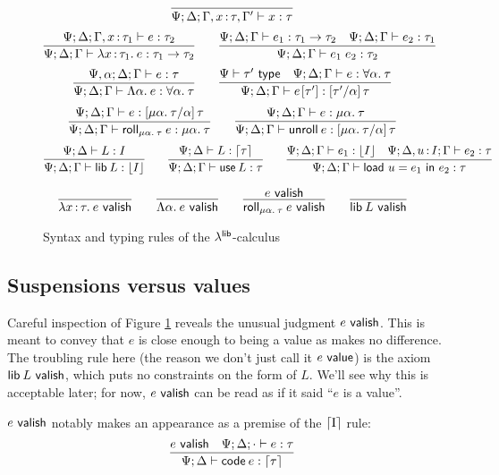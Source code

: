 \documentclass[11pt]{article}
\begin{document}
\begin{figure}[p]
\begin{description}
    \[
    \infer{\Psi;\D;\G, x \of \tau, \G' \ent x \isa \tau}{}
    \]\[
    \infer{\Psi;\D;\G \ent \lam{x}{\tau_1}{e} \isa \tau_1 \to \tau_2}{
      \Psi;\D;\G, x \of \tau_1 \ent e \isa \tau_2} \qquad
    \infer{\Psi;\D;\G \ent e_1 \ap e_2 \isa \tau_2}{
      \Psi;\D;\G \ent e_1 \isa \tau_1 \to \tau_2 &
      \Psi;\D;\G \ent e_2 \isa \tau_1}
    \]\[
    \infer{\Psi;\D;\G \ent \Lam{\alpha}{e} \isa \fa{\alpha}{\tau}}{
      \Psi,\alpha;\D;\G \ent e \isa \tau} \qquad
    \infer{\Psi;\D;\G \ent \Ap{e}{\tau'} \isa \sub{\tau'}{\alpha}{\tau}}{
      \Psi \ent \tau' \istype &
      \Psi;\D;\G \ent e \isa \fa{\alpha}{\tau}}
    \]\[
    \infer{\Psi;\D;\G \ent \roll{\alpha}{\tau}{e} \isa \trec{\alpha}{\tau}}{
      \Psi;\D;\G \ent e \isa \sub{\trec{\alpha}{\tau}}{\alpha}{\tau}}
    \qquad
    \infer{\Psi;\D;\G \ent \unroll{e} \isa \sub{\trec{\alpha}{\tau}}{\alpha}{\tau}}{
      \Psi;\D;\G \ent e \isa \trec{\alpha}{\tau}}
    \]\[
    \infer{\Psi;\D;\G \ent \lib{L} \isa \dn{I}}{\Psi;\D \ent L \isa I} \qquad
    \infer{\Psi;\D;\G \ent \use{L} \isa \tau}{\Psi;\D \ent L \isa \up{\tau}}
    \qquad
    \infer{\Psi;\D;\G \ent \load{u}{e_1}{e_2} \isa \tau}{
      \Psi;\D;\G \ent e_1 \isa \dn{I} &
      \Psi;\D, u \of I; \G \ent e_2 \isa \tau}
    \]

    \[
    \infer{\lam{x}{\tau}{e} \valish}{} \qquad
    \infer{\Lam{\alpha}{e} \valish}{} \qquad
    \infer{\roll{\alpha}{\tau}{e} \valish}{e \valish} \qquad
    \infer{\lib{L} \valish}{}
    \]

  \end{description}

  \caption{Syntax and typing rules of the $\lambda^{\textsf{lib}}$-calculus}
  \label{fig:llib}
\end{figure}


\subsection{Suspensions versus values}

Careful inspection of Figure \ref{fig:llib} reveals the unusual judgment $e
~\textsf{valish}$. This is meant to convey that $e$ is close enough to being a value as
makes no difference. The troubling rule here (the reason we don't just call it
$e ~\textsf{value}$) is the axiom $\textsf{lib}\:{L} ~\textsf{valish}$, which puts no constraints on the
form of $L$. We'll see why this is acceptable later; for now, $e ~\textsf{valish}$ can be
read as if it said ``$e$ is a value''.

$e ~\textsf{valish}$ notably makes an appearance as a premise of the $\lceil{\text{I}}\rceil$
rule:
\[
\infer{\Psi;\D \ent \code{e} \isa \up{\tau}}{
  e \valish &
  \Psi;\D;\ecx \ent e \isa \tau}
\]
\end{document}
